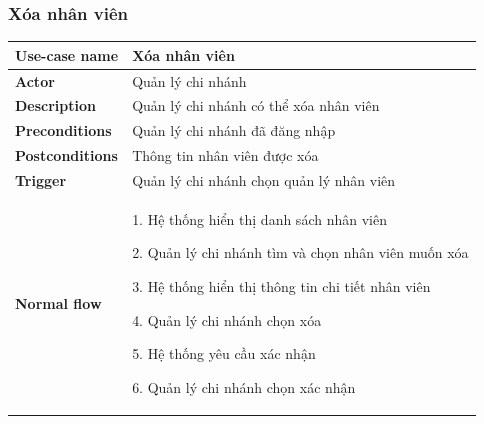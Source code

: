         \subsubsection{Xóa nhân viên}
        {
\setlength\extrarowheight{6pt}
            \begin{longtable}{| p{} | p{} |} 
                \hline
                    \textbf{Use-case name} 
                & 
                    Xóa nhân viên
                \\
                \hline
                    \textbf{Actor} 
                & 
                    Quản lý chi nhánh
                \\
                \hline
                    \textbf{Description} 
                & 
                    Quản lý chi nhánh có thể xóa nhân viên
                \\
                \hline
                    \textbf{Preconditions} 
                &
                    Quản lý chi nhánh đã đăng nhập
                \\
                \hline
                    \textbf{Postconditions} 
                & 
                    Thông tin nhân viên được xóa
                \\
                \hline
                    \textbf{Trigger} 
                & 
                    Quản lý chi nhánh chọn quản lý nhân viên
                \\
                \hline
                \begin{flushleft}
                    \textbf{Normal flow}
                \end{flushleft}
                & 
                    1. Hệ thống hiển thị danh sách nhân viên
                    
                    2. Quản lý chi nhánh tìm và chọn nhân viên muốn xóa
                    
                    3. Hệ thống hiển thị thông tin chi tiết nhân viên
                    
                    4. Quản lý chi nhánh chọn xóa
                    
                    5. Hệ thống yêu cầu xác nhận
                    
                    6. Quản lý chi nhánh chọn xác nhận
                    

\end{longtable}}

